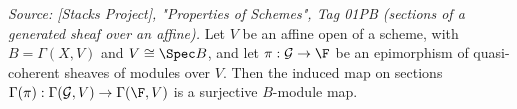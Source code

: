 \begin{lemma}
  \label{lem:gf_affine_qcoh_Gamma_epi}
  \textit{Source: [Stacks Project], "Properties of Schemes", Tag 01PB (sections of a
  generated sheaf over an affine).}
  Let \(V\) be an affine open of a scheme, with \(B = \Gamma(X, V)\) and
  \(V \cong \Spec B\), and let \(\pi : \mathcal{G} \to \F\) be an epimorphism of
  quasi-coherent sheaves of modules over \(V\). Then the induced map on sections
  \(\Gamma(\pi) : \Gamma(\mathcal{G}, V) \to \Gamma(\F, V)\) is a surjective
  \(B\)-module map.
\end{lemma}

